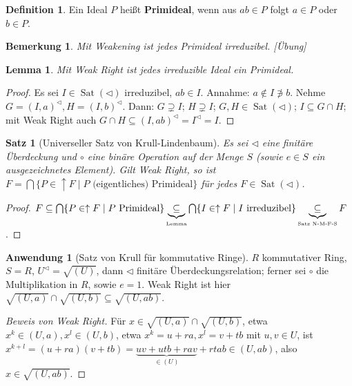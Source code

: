 \documentclass[headsepline=true,DIV=11]{scrartcl}
\newtheorem*{theorem}{Satz}
\newtheorem*{lemma}{Lemma}
\newtheorem*{remark}{Bemerkung}
\theoremstyle{definition}
\newtheorem*{definition}{Definition}
\newcommand{\Sat}{\operatorname{Sat}}
\begin{document}
\begin{definition}
  Ein Ideal $P$ heißt {\bf Primideal}, wenn aus $ab\in P$ folgt $a\in P$ oder $b\in P$.
\end{definition}

\begin{remark}
  Mit Weakening ist jedes Primideal irreduzibel. [Übung]
\end{remark}

\begin{lemma}
  Mit Weak Right ist jedes irreduzible Ideal ein Primideal.
\end{lemma}

\begin{proof}
  Es sei $I\in\Sat(\lhd)$ irreduzibel, $ab\in I$. Annahme: $a\not\in I\not\ni b$. Nehme $G=(I,a)^\lhd,H=(I,b)^\lhd$. Dann: $G\supsetneq I$;
  $H\supsetneq I$; $G,H\in\Sat(\lhd)$; $I\subseteq G\cap H$; mit Weak Right auch $G\cap H\subseteq (I,ab)^\lhd=I^\lhd=I$.
\end{proof}

\begin{theorem}[Universeller Satz von Krull-Lindenbaum]
  Es sei $\lhd$ eine finitäre Überdeckung und $\circ$ eine binäre Operation auf der Menge $S$ (sowie $e\in S$ ein ausgezeichnetes Element). Gilt Weak
  Right, so ist $F=\bigcap\{P\in\uparrow F\mid P\mbox{ (eigentliches) Primideal}\}$ für jedes $F\in\Sat(\lhd)$.
\end{theorem}

\begin{proof}
  $F\subseteq\bigcap\{P\in\uparrow F\mid P\mbox{ Primideal}\}\underbrace{\subseteq}_{\mbox{\tiny Lemma}}\bigcap\{I\in\uparrow F\mid I\mbox{
    irreduzibel}\}\underbrace{\subseteq}_{\mbox{\tiny Satz N-M-F-S}} F$.
\end{proof}

{\bf Anwendung 1} (Satz von Krull für kommutative Ringe). $R$ kommutativer Ring, $S=R$, $U^\lhd=\sqrt{(U)}$, dann $\lhd$ finitäre
Überdeckungsrelation; ferner sei $\circ$ die Multiplikation in $R$, sowie $e=1$. Weak Right ist hier
$\sqrt{(U,a)}\cap\sqrt{(U,b)}\subseteq\sqrt{(U,ab)}$.

\begin{proof}[Beweis von Weak Right]
  Für $x\in\sqrt{(U,a)}\cap\sqrt{(U,b)}$, etwa $x^k\in(U,a),x^l\in(U,b)$, etwa $x^k=u+ra,x^l=v+tb$ mit $u,v\in U$, ist
  $x^{k+l}=(u+ra)(v+tb)=\underbrace{uv+utb+rav}_{\in(U)}+rtab\in(U,ab)$, also $x\in\sqrt{(U,ab)}$.
\end{proof}

\end{document}
